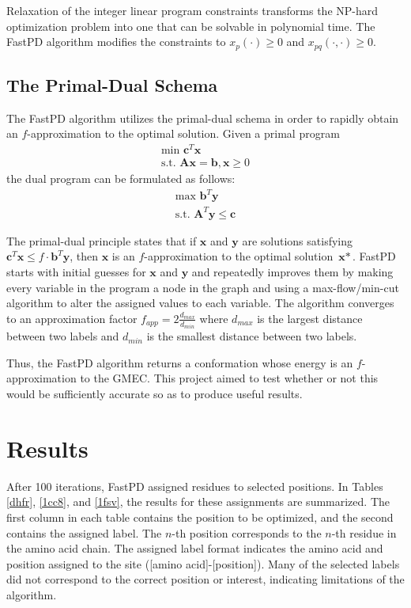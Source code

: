 \documentclass[11pt]{article}
\begin{document}
	Relaxation of the integer linear program constraints transforms the NP-hard
	optimization problem into one that can be solvable in polynomial time.  The 
	FastPD algorithm modifies the constraints to 
	$x_p(\cdot) \ge 0$ and $x_{pq}(\cdot, \cdot) \ge 0$.  

	\subsection{The Primal-Dual Schema}	
	
	The FastPD algorithm utilizes the primal-dual schema in order to rapidly obtain
	an $f$-approximation to the optimal solution. Given a primal program
	\begin{gather*}
	\text{min }\textbf{c}^T\textbf{x} \\
	\text{s.t. }\textbf{Ax} = \textbf{b}, \textbf{x} \geq 0
	\end{gather*}
	the dual program can be formulated as follows:
	\begin{gather*}
	\text{max } \textbf{b}^T\textbf{y} \\
	\text{s.t. }\textbf{A}^T\textbf{y} \leq \textbf{c} 
	\end{gather*}		

	The primal-dual principle states that if $\textbf{x}$ and $\textbf{y}$ are
	solutions satisfying $\textbf{c}^T\textbf{x} \leq f \cdot \textbf{b}^T\textbf{y}$,
	then $\textbf{x}$ is an $f$-approximation to the optimal solution $\textbf{x}*$.
	FastPD starts with initial guesses for $\textbf{x}$ and $\textbf{y}$ and 
	repeatedly improves them by making every variable in the program a node in the
	graph and using a max-flow/min-cut algorithm to alter the assigned values to
	each variable. The algorithm converges to an approximation factor
	$f_{app} = 2 \frac{d_{max}}{d_{min}}$ where $d_{max}$ is the largest distance
	between two labels and $d_{min}$ is the smallest distance between two labels. 
	
	Thus, the FastPD algorithm returns a conformation whose energy is an $f$-
	approximation to the GMEC. This project aimed to test whether or not this would
	be sufficiently accurate so as to produce useful results. 

	\section{Results}
	After 100 iterations, FastPD assigned residues to selected positions.  In Tables
	\ref{dhfr}, \ref{1cc8}, and \ref{1fsv}, the results for these assignments are
	summarized.  The first column in each table contains the position to be optimized,
	and the second contains the assigned label. The $n$-th position corresponds to
	the $n$-th residue in the amino acid chain. The assigned label format indicates
	the amino acid and position assigned to the site ([amino acid]-[position]).  Many
	of the selected labels did not correspond to the correct position or interest,
	indicating limitations of the algorithm. 
	
\end{document}
